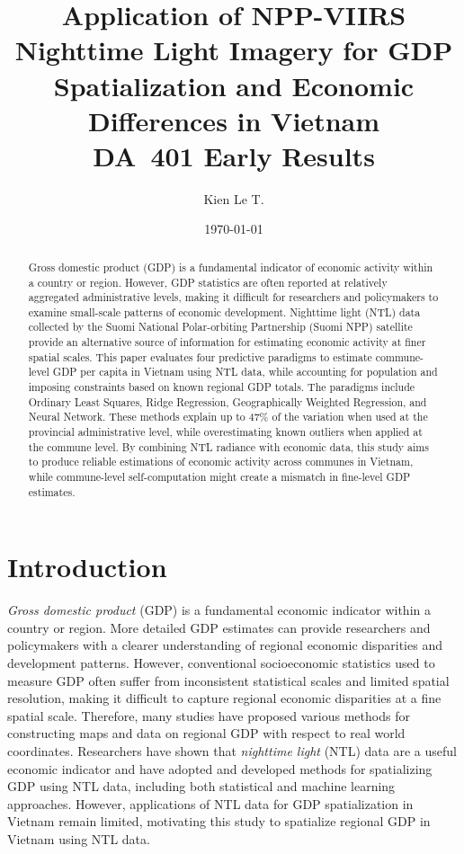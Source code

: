 \documentclass[11pt]{article} %
\title{Application of NPP-VIIRS Nighttime Light Imagery for GDP Spatialization and Economic Differences in Vietnam\\
\Large DA~401 Early Results}
\author{Kien Le T.}
\date{\today}
\begin{document}
\maketitle

\begin{abstract}
Gross domestic product (GDP) is a fundamental indicator of economic activity within a country or region. However, GDP statistics are often reported at relatively aggregated administrative levels, making it difficult for researchers and policymakers to examine small-scale patterns of economic development. Nighttime light (NTL) data collected by the Suomi National Polar-orbiting Partnership (Suomi NPP) satellite provide an alternative source of information for estimating economic activity at finer spatial scales. This paper evaluates four predictive paradigms to estimate commune-level GDP per capita in Vietnam using NTL data, while accounting for population and imposing constraints based on known regional GDP totals. The paradigms include Ordinary Least Squares, Ridge Regression, Geographically Weighted Regression, and Neural Network.  These methods explain up to 47\% of the variation when used at the provincial administrative level, while overestimating known outliers when applied at the commune level. By combining NTL radiance with economic data, this study aims to produce reliable estimations of economic activity across communes in Vietnam, while commune-level self-computation might create a mismatch in fine-level GDP estimates.
\end{abstract}


\section{Introduction}

\emph{Gross domestic product} (GDP) is a fundamental economic indicator within a country or region. More detailed GDP estimates can provide researchers and policymakers with a clearer understanding of regional economic disparities and development patterns. However, conventional socioeconomic statistics used to measure GDP often suffer from inconsistent statistical scales and limited spatial resolution, making it difficult to capture regional economic disparities at a fine spatial scale. Therefore, many studies have proposed various methods for constructing maps and data on regional GDP with respect to real world coordinates. Researchers have shown that \emph{nighttime light} (NTL) data are a useful economic indicator and have adopted and developed methods for spatializing GDP using NTL data, including both statistical and machine learning approaches. However, applications of NTL data for GDP spatialization in Vietnam remain limited, motivating this study to spatialize regional GDP in Vietnam using NTL data.
\end{document}
